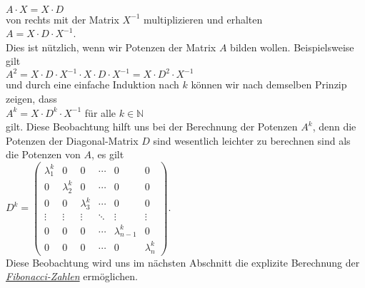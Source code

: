 \\[0.2cm]
\hspace*{1.3cm}
$A \cdot X = X \cdot D$
\\[0.2cm]
von rechts mit der Matrix $X^{-1}$ multiplizieren und erhalten
\\[0.2cm]
\hspace*{1.3cm}
$A = X \cdot D \cdot X^{-1}$.
\\[0.2cm]
Dies ist n\"utzlich, wenn wir Potenzen der Matrix $A$ bilden wollen.  Beispielsweise gilt
\\[0.2cm]
\hspace*{1.3cm}
$A^2 = X \cdot D \cdot X^{-1} \cdot X \cdot D \cdot X^{-1} = X \cdot D^2 \cdot X^{-1}$
\\[0.2cm]
und durch eine einfache Induktion nach $k$ k\"onnen wir nach demselben Prinzip zeigen, dass
\\[0.2cm]
\hspace*{1.3cm}
$A^k = X \cdot D^k \cdot X^{-1}$ \quad f\"ur alle $k \in \mathbb{N}$
\\[0.2cm]
gilt.  Diese Beobachtung hilft uns bei der Berechnung der Potenzen $A^k$, denn die Potenzen der
Diagonal-Matrix $D$ sind wesentlich  leichter zu berechnen sind als die Potenzen von $A$, es gilt
\\[0.2cm]
\hspace*{1.3cm}
$D^k = \left(
  \begin{array}{llllll}
    \lambda_1^k & 0         & 0         & \cdots & 0 & 0 \\ 
    0           & \lambda_2^k & 0         & \cdots & 0 & 0 \\
    0           & 0         & \lambda_3^k & \cdots & 0 & 0 \\
    \vdots      & \vdots    & \vdots    & \ddots & \vdots & \vdots \\
    0           & 0         & 0         & \cdots  & \lambda_{n-1}^k & 0 \\
    0           & 0         & 0         & \cdots & 0 & \lambda_n^k 
  \end{array}
\right)
$.
\\[0.2cm]
Diese Beobachtung wird uns im n\"achsten Abschnitt die explizite Berechnung der
\href{http://de.wikipedia.org/wiki/Fibonacci-Folge}{\emph{Fibonacci-Zahlen}} erm\"oglichen. 

